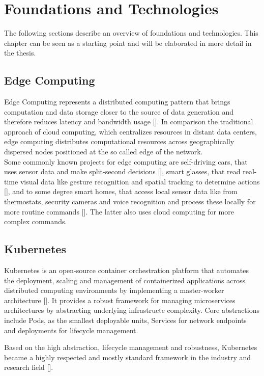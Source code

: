 \chapter{Foundations and Technologies}
The following sections describe an overview of foundations and technologies.
This chapter can be seen as a starting point and will be elaborated in more detail in the thesis.

\section{Edge Computing}
Edge Computing represents a distributed computing pattern that brings computation and data storage closer to the source of data generation and
therefore reduces latency and bandwidth usage [\cite{7488250}]. In comparison the traditional approach of cloud computing, which centralizes resources in distant
data centers, edge computing distributes computational resources across geographically dispersed nodes positioned at the so called edge of the network.
\\
Some commonly known projects for edge computing are self-driving cars, that uses sensor data and make split-second decisions [\cite{9546662}], 
smart glasses, that read real-time visual data like gesture recognition and spatial tracking to determine actions [\cite{10134901}], and to some degree smart homes, that access local sensor data like from thermostats, security cameras and voice recognition and process these locally for more routine commands [\cite{7488250}].
The latter also uses cloud computing for more complex commands.

\section{Kubernetes}
Kubernetes is an open-source container orchestration platform that automates the deployment, scaling and management of containerized applications across distributed computing environments by implementing a master-worker architecture [\cite{10.5555/3175917}].
It provides a robust framework for managing microservices architectures by abstracting underlying infrastructe complexity.
Core abstractions include Pods, as the smallest deployable units, Services for network endpoints and deployments for lifecycle management.

Based on the high abstraction, lifecycle management and robustness, Kubernetes became a highly respected and mostly standard framework in the industry and research field [\cite{10.1145/3539606}].

